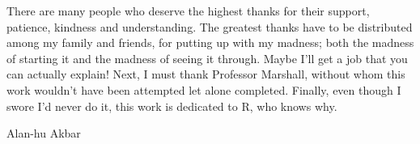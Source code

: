 There are many people who deserve the highest thanks for their support, patience, kindness and understanding.
The greatest thanks have to be distributed among my family and friends, for putting up with my madness; both the madness of starting it and the madness of seeing it through.
Maybe I'll get a job that you can actually explain! 
Next, I must thank Professor Marshall, without whom this work wouldn't have been attempted let alone completed.
Finally, even though I swore I'd never do it, this work is dedicated to R, who knows why.

{\centering
Alan-hu Akbar\par
}

